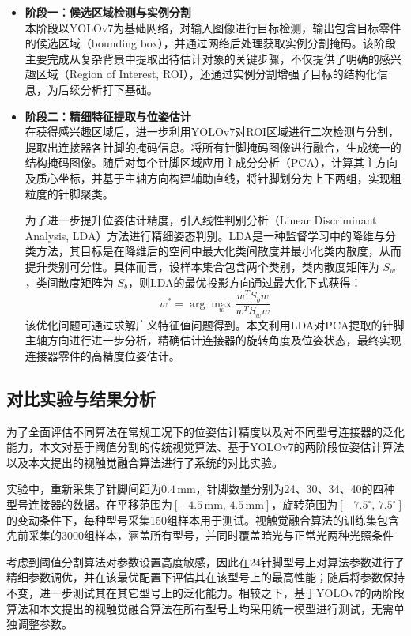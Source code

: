 \documentclass{Diploma}
\begin{document}
\begin{itemize}
  \item \textbf{阶段一：候选区域检测与实例分割} \\
  本阶段以YOLOv7为基础网络，对输入图像进行目标检测，输出包含目标零件的候选区域（bounding box），并通过网络后处理获取实例分割掩码。该阶段主要完成从复杂背景中提取出待估计对象的关键步骤，不仅提供了明确的感兴趣区域（Region of Interest, ROI），还通过实例分割增强了目标的结构化信息，为后续分析打下基础。
  
  \item \textbf{阶段二：精细特征提取与位姿估计} \\
  在获得感兴趣区域后，进一步利用YOLOv7对ROI区域进行二次检测与分割，提取出连接器各针脚的掩码信息。将所有针脚掩码图像进行融合，生成统一的结构掩码图像。随后对每个针脚区域应用主成分分析（PCA），计算其主方向及质心坐标，并基于主轴方向构建辅助直线，将针脚划分为上下两组，实现粗粒度的针脚聚类。

  为了进一步提升位姿估计精度，引入线性判别分析（Linear Discriminant Analysis, LDA）方法进行精细姿态判别。LDA是一种监督学习中的降维与分类方法，其目标是在降维后的空间中最大化类间散度并最小化类内散度，从而提升类别可分性\cite{blei2003latent}。具体而言，设样本集合包含两个类别，类内散度矩阵为 $S_w$，类间散度矩阵为 $S_b$，则LDA的最优投影方向通过最大化下式获得：
  \begin{equation}\label{eq:lda}
  w^* = \arg\max_{w} \frac{w^T S_b w}{w^T S_w w}
  \end{equation}
  该优化问题可通过求解广义特征值问题得到。本文利用LDA对PCA提取的针脚主轴方向进行进一步分析，精确估计连接器的旋转角度及位姿状态，最终实现连接器零件的高精度位姿估计。
\end{itemize}
\subsection{对比实验与结果分析}
为了全面评估不同算法在常规工况下的位姿估计精度以及对不同型号连接器的泛化能力，本文对基于阈值分割的传统视觉算法、基于YOLOv7的两阶段位姿估计算法以及本文提出的视触觉融合算法进行了系统的对比实验。

实验中，重新采集了针脚间距为$0.4\,\mathrm{mm}$，针脚数量分别为24、30、34、40的四种型号连接器的数据。在平移范围为$[-4.5\,\mathrm{mm},\,4.5\,\mathrm{mm}]$，旋转范围为$[-7.5^{\circ},\,7.5^{\circ}]$的变动条件下，每种型号采集150组样本用于测试。视触觉融合算法的训练集包含先前采集的3000组样本，涵盖所有型号，并同时覆盖暗光与正常光两种光照条件

考虑到阈值分割算法对参数设置高度敏感，因此在24针脚型号上对算法参数进行了精细参数调优，并在该最优配置下评估其在该型号上的最高性能；随后将参数保持不变，进一步测试其在其它型号上的泛化能力。相较之下，基于YOLOv7的两阶段算法和本文提出的视触觉融合算法在所有型号上均采用统一模型进行测试，无需单独调整参数。
\end{document}
